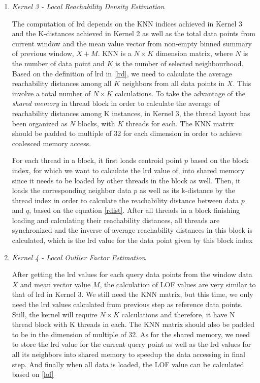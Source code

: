 \documentclass[11pt]{article}       %
\begin{document}
\begin{enumerate}
	\item {\textit{Kernel 3 - Local Reachability Density Estimation}}
	
	The computation of lrd depends on the KNN indices achieved in Kernel 3 and the K-distances achieved in Kernel 2 as well as the total data points from current window and the mean value vector from non-empty binned summary of previous window, $X + M$. KNN is a $N \times K$ dimension matrix, where $N$ is the number of data point and $K$ is the number of selected neighbourhood. Based on the definition of lrd in \ref{lrd}, we need to calculate the average reachability distances among all $K$ neighbors from all data points in $X$. This involve a total number of $N \times K$ calculations. To take the advantage of the \textit{shared memory} in thread block in order to calculate the average of reachability distances among K instances, in Kernel 3, the thread layout has been organized as $N$ blocks, with $K$ threads for each. The KNN matrix should be padded to multiple of 32 for each dimension in order to achieve coalesced memory access. 
	
	For each thread in a block, it first loads centroid point $p$ based on the block index, for which we want to calculate the lrd value of, into shared memory since it needs to be loaded by other threads in the block as well. Then, it loads the corresponding neighbor data $p$ as well as its k-distance by the thread index in order to calculate the reachability distance between data $p$ and $q$, based on the equation \ref{rdist}. After all threads in a block finishing loading and calculating their reachability distances, all threads are synchronized and the inverse of average reachability distances in this block is calculated, which is the lrd value for the data point given by this block index
			
	\item {\textit{Kernel 4 - Local Outlier Factor Estimation}}
	
	After getting the lrd values for each query data points from the window data $X$ and mean vector value $M$, the calculation of LOF values are very similar to that of lrd in Kernel 3. We still need the KNN matrix, but this time, we only need the lrd values calculated from previous step as reference data points. Still, the kernel will require $N \times K$ calculations and therefore, it have N thread block with K threads in each. The KNN matrix should also be padded to be in the dimension of multiple of 32. As for the shared memory, we need to store the lrd value for the current query point as well as the lrd values for all its neighbors into shared memory to speedup the data accessing in final step. And finally when all data is loaded, the LOF value can be calculated based on \ref{lof}

\end{enumerate}
\end{document}
